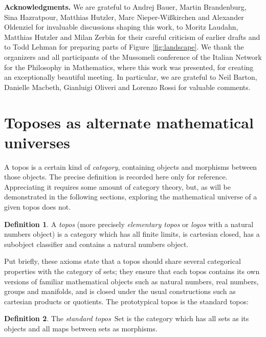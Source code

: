 \documentclass[oneside,reqno]{amsart}
\theoremstyle{definition}
\newtheorem{defn}{Definition}[section]
\theoremstyle{plain}
\theoremstyle{remark}
\newcommand{\Set}{\mathrm{Set}}
\renewcommand{\_}{\mathpunct{.}\,}
\newcommand{\?}{\,{:}\,}
\renewcommand{\paragraph}[1]{\noindent\textbf{#1.}}
\begin{document}
\bigskip
\paragraph{Acknowledgments} We are grateful to Andrej Bauer, Martin
Brandenburg, Sina Hazratpour, Matthias Hutzler, Marc Nieper-Wißkirchen and
Alexander Oldenziel for invaluable discussions shaping this work, to Moritz
Laudahn, Matthias Hutzler and Milan Zerbin for their careful criticism of
earlier drafts and to Todd Lehman for preparing parts of
Figure~\ref{fig:landscape}. We thank the organizers and all participants of the
Mussomeli conference of the Italian Network for the Philosophy in Mathematics,
where this work was presented, for creating an exceptionally beautiful meeting. In
particular, we are grateful to Neil Barton, Danielle Macbeth, Gianluigi Oliveri
and Lorenzo Rossi for valuable comments.

\tableofcontents


\section{Toposes as alternate mathematical universes}

A topos is a certain kind of \emph{category}, containing objects and
morphisms between those objects. The precise definition is recorded here only for
reference. Appreciating it requires some amount of category theory, but, as will be demonstrated in
the following sections, exploring the mathematical universe of a given topos
does not.

\begin{defn}A \emph{topos} (more precisely \emph{elementary topos} or
\emph{logos} with a natural numbers object) is a category which has all finite
limits, is cartesian closed, has a subobject classifier and contains a natural
numbers object.\end{defn}

Put briefly, these axioms state that a topos should share several categorical
properties with the category of sets; they ensure that each topos contains its
own versions of familiar mathematical objects such as natural numbers, real
numbers, groups and manifolds, and is closed under the usual constructions
such as cartesian products or quotients.
The prototypical topos is the standard topos:

\begin{defn}The \emph{standard topos}~$\Set$ is the category which has all
sets as its objects and all maps between sets as morphisms.\end{defn}
\end{document}
